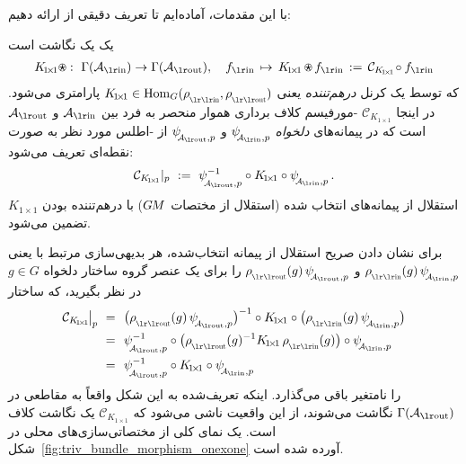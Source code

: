 با این مقدمات، آماده‌ایم تا تعریف دقیقی از \onexoneGMsfarsi ارائه دهیم:
\begin{dfn}[\onexoneGMfarsi]
\label{dfn:onexone}
    یک \onexoneGMfarsi یک نگاشت است
    \begin{align}
        K_{\!1\!\times\!1} \ostar :\ \Gamma(\Ain) \to \Gamma(\Aout),\ \ \ 
        \fin \,\mapsto\, K_{\!1\!\times\!1} \,\ostar\, \fin \,:=\, \mathcal{C}_{K_{\!1\!\times\!1}}\! \circ \fin
    \end{align}
    که توسط یک کرنل \emph{درهم‌تننده} \onexoneGMfarsi یعنی $K_{\!1\!\times\!1} \in \Hom_G(\rhoin,\rhoout)$ پارامتری می‌شود.
    در اینجا $\mathcal{C}_{K_{\!1\!\times\!1}}$ \lr{M}-مورفیسم کلاف برداری هموار منحصر به فرد بین $\Ain$ و $\Aout$ است که در پیمانه‌های \emph{دلخواه} $\psiAinp$ و $\psiAoutp$ از -اطلس مورد نظر به صورت نقطه‌ای تعریف می‌شود:
    \begin{align}
        \mathcal{C}_{K_{\!1\!\times\!1}}|_p\ :=\ \psiAoutp^{-1} \circ K_{\!1\!\times\!1} \circ \psiAinp \,.
    \end{align}
    استقلال از پیمانه‌های انتخاب شده (استقلال از مختصات $G\mkern-1.4muM$) با درهم‌تننده بودن $K_{\!1\!\times\!1}$ تضمین می‌شود.
\end{dfn}
برای نشان دادن صریح استقلال از پیمانه انتخاب‌شده، هر بدیهی‌سازی مرتبط با  یعنی $\rhoin(g)\,\psiAinp$ و $\rhoout(g)\,\psiAoutp$ را برای یک عنصر گروه ساختار دلخواه $g\in G$ در نظر بگیرید، که ساختار
\begin{align}
    \mathcal{C}_{K_{\!1\!\times\!1}} \mkern-2mu\big|_p\ 
    =\ \ &\big(\rhoout(g)\, \psiAoutp \big)^{-1} \circ K_{\!1\!\times\!1} \circ \big(\rhoin(g)\, \psiAinp\big) \notag \\
    =\ \ &\psiAoutp^{-1} \circ \big( \rhoout(g)^{-1} K_{\!1\!\times\!1}\, \rhoin(g) \big) \circ \psiAinp \notag \\
    =\ \ &\psiAoutp^{-1} \circ K_{\!1\!\times\!1} \circ \psiAinp
\end{align}
را نامتغیر باقی می‌گذارد.
اینکه \onexoneGMsfarsi تعریف‌شده به این شکل واقعاً به مقاطعی در $\Gamma(\Aout)$ نگاشت می‌شوند، از این واقعیت ناشی می‌شود که $\mathcal{C}_{K_{\!1\!\times\!1}}$ یک نگاشت کلاف است.
یک نمای کلی از مختصاتی‌سازی‌های محلی \onexoneGMsfarsi در شکل~\ref{fig:triv_bundle_morphism_onexone} آورده شده است.

